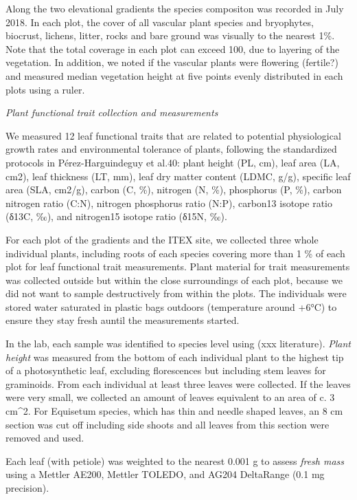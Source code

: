 \documentclass[a4paper]{article}
\begin{document}
Along the two elevational gradients the species compositon was recorded in July 2018.
In each plot, the cover of all vascular plant species and bryophytes, biocrust, lichens, litter, rocks and bare ground was visually to the nearest 1\%.
Note that the total coverage in each plot can exceed 100, due to layering of the vegetation.
In addition, we noted if the vascular plants were flowering (fertile?) and measured median vegetation height at five points evenly distributed in each plots using a ruler.

\emph{Plant functional trait collection and measurements}

We measured 12 leaf functional traits that are related to potential physiological growth rates and environmental tolerance of plants, following the standardized protocols in Pérez-Harguindeguy et al.40: plant height (PL, cm), leaf area (LA, cm2), leaf thickness (LT, mm), leaf dry matter content (LDMC, g/g), specific leaf area (SLA, cm2/g), carbon (C, \%), nitrogen (N, \%), phosphorus (P, \%), carbon nitrogen ratio (C:N), nitrogen phosphorus ratio (N:P), carbon13 isotope ratio (δ13C, ‰), and nitrogen15 isotope ratio (δ15N, ‰).

For each plot of the gradients and the ITEX site, we collected three whole individual plants, including roots of each species covering more than 1 \% of each plot for leaf functional trait measurements.
Plant material for trait measurements was collected outside but within the close surroundings of each plot, because we did not want to sample destructively from within the plots.
The individuals were stored water saturated in plastic bags outdoors (temperature around +6°C) to ensure they stay fresh auntil the measurements started.

In the lab, each sample was identified to species level using (xxx literature).
\emph{Plant height} was measured from the bottom of each individual plant to the highest tip of a photosynthetic leaf, excluding florescences but including stem leaves for graminoids.
From each individual at least three leaves were collected.
If the leaves were very small, we collected an amount of leaves equivalent to an area of c. 3 cm\^{}2.
For Equisetum species, which has thin and needle shaped leaves, an 8 cm section was cut off including side shoots and all leaves from this section were removed and used.

Each leaf (with petiole) was weighted to the nearest 0.001 g to assess \emph{fresh mass} using a Mettler AE200, Mettler TOLEDO, and AG204 DeltaRange (0.1 mg precision).
\end{document}
